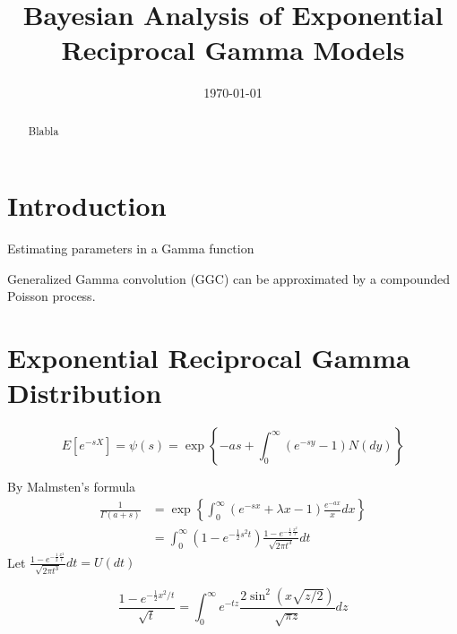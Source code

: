 \documentclass[11pt]{article}%
\title{Bayesian Analysis of Exponential Reciprocal Gamma Models}
\author{ 
}
\date{\today}
\begin{document}
	
\maketitle
\begin{abstract}
\noindent Blabla


\bigskip
{} 
\end{abstract}

\newpage
\section{Introduction}
Estimating parameters in a Gamma function \cite{blei2003latent} \cite{escobar1995bayesian}

\cite{bondesson1982simulation} \cite{bondesson1992generalized} \cite{walker2000miscellanea} \cite{ferguson1972representation} \cite{windle2014sampling} \cite{polson2011data} \cite{minka2000estimating}

\cite{roynette2005couples} \cite{hartman1976completely} \cite{polson2013bayesian} 

Generalized Gamma convolution (GGC) can be approximated by a compounded Poisson process. 

\section{Exponential Reciprocal Gamma Distribution}

\begin{equation}
E[e^{-sX}] = \psi(s) = \exp\left\{-as + \int_{0}^\infty (e^{-sy} - 1) N(dy)\right\}
\end{equation}


By Malmsten's formula 
\begin{equation}
\begin{aligned}
\frac{1}{\Gamma(a + s)} &= \exp\left\{\int_{0}^{\infty} (e^{-sx} + \lambda x - 1) \frac{e^{-ax}}{x}dx \right\}\\
&= \int_{0}^{\infty} (1 - e^{-\frac{1}{2} s^2 t}) \frac{1 - e^{-\frac{1}{2} \frac{x^2}{t}}}{\sqrt{2\pi t^3}}dt
\end{aligned}
\end{equation}
Let $\frac{1 - e^{-\frac{1}{2} \frac{x^2}{t}}}{\sqrt{2\pi t^3}}dt = U(dt)$


\begin{equation}
\frac{1 - e^{-\frac{1}{2}x^2/t}}{\sqrt{t}} = \int_0^{\infty} e^{-tz}\frac{2\sin^2(x \sqrt{z / 2})}{\sqrt{\pi z}} dz
\end{equation}
 
\end{document}
